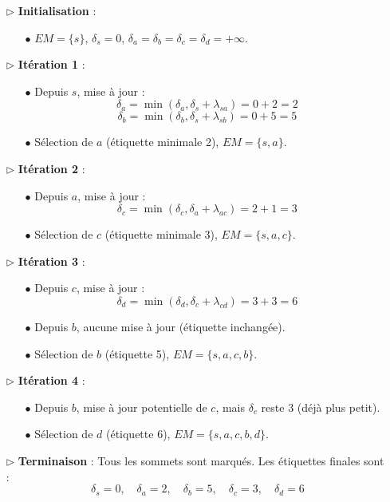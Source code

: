 \documentclass{report}
\begin{document}
\begin{multicols*}{2}
\begin{itemize}
    \item[\( \rhd \)] \textbf{Initialisation} :
    \begin{itemize}
        \item[\( \bullet \)] \( EM = \{ s \} \), \( \delta_s = 0 \), \( \delta_a = \delta_b = \delta_c = \delta_d = +\infty \).
    \end{itemize}
    \item[\( \rhd \)] \textbf{Itération 1} :
    \begin{itemize}
        \item[\( \bullet \)] Depuis \( s \), mise à jour :
        \[
        \delta_a = \min(\delta_a, \delta_s + \lambda_{sa}) = 0 + 2 = 2
        \]
        \[
        \delta_b = \min(\delta_b, \delta_s + \lambda_{sb}) = 0 + 5 = 5
        \]
        \item[\( \bullet \)] Sélection de \( a \) (étiquette minimale 2), \( EM = \{ s, a \} \).
    \end{itemize}
    \item[\( \rhd \)] \textbf{Itération 2} :
    \begin{itemize}
        \item[\( \bullet \)] Depuis \( a \), mise à jour :
        \[
        \delta_c = \min(\delta_c, \delta_a + \lambda_{ac}) = 2 + 1 = 3
        \]
        \item[\( \bullet \)] Sélection de \( c \) (étiquette minimale 3), \( EM = \{ s, a, c \} \).
    \end{itemize}
    \item[\( \rhd \)] \textbf{Itération 3} :
    \begin{itemize}
        \item[\( \bullet \)] Depuis \( c \), mise à jour :
        \[
        \delta_d = \min(\delta_d, \delta_c + \lambda_{cd}) = 3 + 3 = 6
        \]
        \item[\( \bullet \)] Depuis \( b \), aucune mise à jour (étiquette inchangée).
        \item[\( \bullet \)] Sélection de \( b \) (étiquette 5), \( EM = \{ s, a, c, b \} \).
    \end{itemize}
    \item[\( \rhd \)] \textbf{Itération 4} :
    \begin{itemize}
        \item[\( \bullet \)] Depuis \( b \), mise à jour potentielle de \( c \), mais \( \delta_c \) reste 3 (déjà plus petit).
        \item[\( \bullet \)] Sélection de \( d \) (étiquette 6), \( EM = \{ s, a, c, b, d \} \).
    \end{itemize}
    \item[\( \rhd \)] \textbf{Terminaison} : Tous les sommets sont marqués. Les étiquettes finales sont :
    \[
    \delta_s = 0, \quad \delta_a = 2, \quad \delta_b = 5, \quad \delta_c = 3, \quad \delta_d = 6
    \]
\end{itemize}


\end{multicols*}
\end{document}
